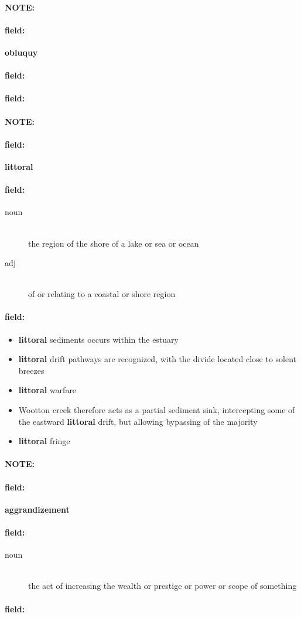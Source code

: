 \documentclass[12pt]{article}
\newenvironment{note}{\paragraph{NOTE:}}{}
\newenvironment{field}{\paragraph{field:}}{}
\begin{document}
\begin{note}
\begin{field}
\textbf{\large obluquy}
\end{field}


\begin{field}
\end{field}

\begin{field}
\end{field}
\end{note}
\begin{note}
\begin{field}
\textbf{\large littoral}
\end{field}


\begin{field}
\begin{description}
\item[noun] \hfill \\ 
the region of the shore of a lake or sea or ocean

\item[adj] \hfill \\ 
of or relating to a coastal or shore region

\end{description}
\end{field}

\begin{field}
\begin{itemize}
\item \textbf{littoral} sediments occurs within the estuary
\item \textbf{littoral} drift pathways are recognized, with the divide located close to solent breezes
\item \textbf{littoral} warfare
\item Wootton creek therefore acts as a partial sediment sink, intercepting some of the eastward \textbf{littoral} drift, but allowing bypassing of the majority
\item \textbf{littoral} fringe
\end{itemize}
\end{field}
\end{note}
\begin{note}
\begin{field}
\textbf{\large aggrandizement}
\end{field}


\begin{field}
\begin{description}
\item[noun] \hfill \\ 
the act of increasing the wealth or prestige or power or scope of something

\end{description}
\end{field}

\begin{field}
\end{field}
\end{note}
\end{document}
